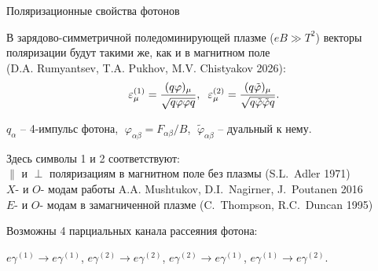 \documentclass{beamer}
\begin{document}
\begin{frame}{Поляризационные свойства фотонов}
	
	\begin{center}	
		\fontsize{10pt}{12pt}\selectfont
		
		В зарядово-симметричной поледоминирующей плазме ($eB\gg T^2$)
		векторы поляризации будут такими же, как и в магнитном поле\\
			(D.A. Rumyantsev, T.A. Pukhov, M.V. Chistyakov 2026):
		\begin{equation}\nonumber
			\varepsilon^{(1)}_\mu=\frac{(q\varphi )_\mu}{\sqrt{q\varphi\varphi q}} ,\hspace{2mm}	\varepsilon^{(2)}_\mu=\frac{(q\tilde{\varphi})_\mu}{\sqrt{q\tilde{\varphi}\tilde{\varphi} q}}.
		\end{equation}
		
		$q_\alpha$ -- 4-импульс фотона, $\;\varphi_{\alpha\beta} = F_{\alpha\beta} / B$, $\;\tilde{\varphi}_{\alpha\beta}$ -- дуальный к нему.
		
		\vspace{3mm}
		
		Здесь символы 1 и 2 соответствуют: 
		\\ $\|$ и $\perp$ поляризациям в магнитном поле без плазмы (S.L.~Adler 1971)
		\\\fontsize{9}{11}\selectfont $X$- и $O$-  модам работы A.A. Mushtukov, D.I.~Nagirner, J.~Poutanen 2016
		\\\fontsize{9}{11}\selectfont $E$- и $O$- модам в замагниченной плазме (C.~Thompson, R.C.~Duncan 1995)
		
		\vspace{2mm}
				Возможны 4 парциальных канала рассеяния фотона:
		
		$e\gamma^{(1)}\to e\gamma^{(1)}$, $e\gamma^{(2)}\to e\gamma^{(2)}$, $e\gamma^{(2)}\to e\gamma^{(1)}$, $e\gamma^{(1)}\to e\gamma^{(2)}$. 
	\end{center}
\end{frame}
\end{document}
